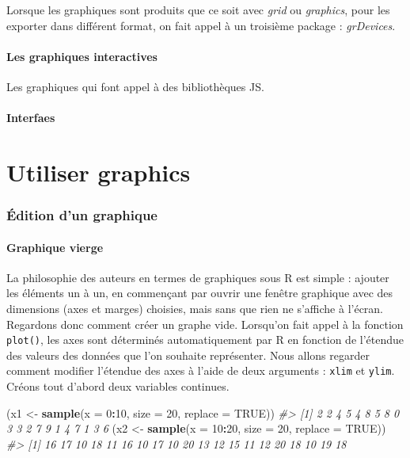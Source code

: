 \documentclass[]{article}
\newenvironment{Shaded}{\begin{snugshade}}{\end{snugshade}}
\newcommand{\CommentTok}[1]{\textcolor[rgb]{0.56,0.35,0.01}{\textit{#1}}}
\newcommand{\DataTypeTok}[1]{\textcolor[rgb]{0.13,0.29,0.53}{#1}}
\newcommand{\DecValTok}[1]{\textcolor[rgb]{0.00,0.00,0.81}{#1}}
\newcommand{\KeywordTok}[1]{\textcolor[rgb]{0.13,0.29,0.53}{\textbf{#1}}}
\newcommand{\NormalTok}[1]{#1}
\newcommand{\OperatorTok}[1]{\textcolor[rgb]{0.81,0.36,0.00}{\textbf{#1}}}
\newcommand{\OtherTok}[1]{\textcolor[rgb]{0.56,0.35,0.01}{#1}}
\newcommand{\StringTok}[1]{\textcolor[rgb]{0.31,0.60,0.02}{#1}}
\begin{document}
Lorsque les graphiques sont produits que ce soit avec \emph{grid} ou \emph{graphics}, pour les exporter dans différent format, on fait appel à un troisième package : \emph{grDevices}.

\hypertarget{les-graphiques-interactives}{%
\subsection{Les graphiques interactives}\label{les-graphiques-interactives}}

Les graphiques qui font appel à des bibliothèques JS.

\hypertarget{interfaes}{%
\subsection{Interfaes}\label{interfaes}}

\hypertarget{part-utiliser-graphics}{%
\part{Utiliser graphics}\label{part-utiliser-graphics}}

\hypertarget{uxe9dition-dun-graphique}{%
\section{Édition d'un graphique}\label{uxe9dition-dun-graphique}}

\hypertarget{graphique-vierge}{%
\subsection{Graphique vierge}\label{graphique-vierge}}

La philosophie des auteurs en termes de graphiques sous R est simple : ajouter les éléments un à un, en commençant par ouvrir une fenêtre graphique avec des dimensions (axes et marges) choisies, mais sans que rien ne s'affiche à l'écran. Regardons donc comment créer un graphe vide.
Lorsqu'on fait appel à la fonction \texttt{plot()}, les axes sont déterminés automatiquement par R en fonction de l'étendue des valeurs des données que l'on souhaite représenter. Nous allons regarder comment modifier l'étendue des axes à l'aide de deux arguments : \texttt{xlim} et \texttt{ylim}.
Créons tout d'abord deux variables continues.

\begin{Shaded}
\begin{Highlighting}[]
\NormalTok{(x1 <-}\StringTok{ }\KeywordTok{sample}\NormalTok{(}\DataTypeTok{x =} \DecValTok{0}\OperatorTok{:}\DecValTok{10}\NormalTok{, }\DataTypeTok{size =} \DecValTok{20}\NormalTok{, }\DataTypeTok{replace =} \OtherTok{TRUE}\NormalTok{))}
\CommentTok{#>  [1] 2 2 4 5 4 8 5 8 0 3 3 2 7 9 1 4 7 1 3 6}
\NormalTok{(x2 <-}\StringTok{ }\KeywordTok{sample}\NormalTok{(}\DataTypeTok{x =} \DecValTok{10}\OperatorTok{:}\DecValTok{20}\NormalTok{, }\DataTypeTok{size =} \DecValTok{20}\NormalTok{, }\DataTypeTok{replace =} \OtherTok{TRUE}\NormalTok{))}
\CommentTok{#>  [1] 16 17 10 18 11 16 10 17 10 20 13 12 15 11 12 20 18 10 19 18}
\end{Highlighting}
\end{Shaded}
\end{document}
